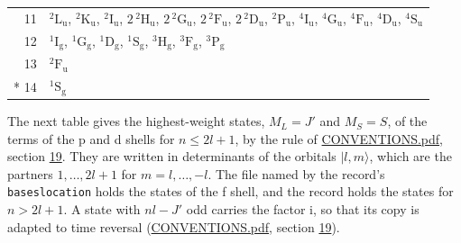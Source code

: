 \documentclass[10pt,a4paper]{article}
\numberwithin{equation}{section}
\newcommand{\spec}[1]{\mathrm{#1}}
\newcommand{\ptag}[1]{\mathrm{#1}}
\newcommand{\iunit}{\mathrm{i}}
\newcommand{\ket}[1]{\lvert #1\rangle}
\newcommand{\term}[2]{{}^{#1}#2}
\newlength{\fillwidth}\newlength{\cellwidth}\newlength{\colwidth}
\begin{document}
{\begin{longtable}{@{}r>{\RaggedRight\arraybackslash}p{\fillwidth}@{}}
11 & $\term{2}{\spec{L}_{\ptag{u}}}$, $\term{2}{\spec{K}_{\ptag{u}}}$, $\term{2}{\spec{I}_{\ptag{u}}}$, $2\,\term{2}{\spec{H}_{\ptag{u}}}$, $2\,\term{2}{\spec{G}_{\ptag{u}}}$, $2\,\term{2}{\spec{F}_{\ptag{u}}}$, $2\,\term{2}{\spec{D}_{\ptag{u}}}$, $\term{2}{\spec{P}_{\ptag{u}}}$, $\term{4}{\spec{I}_{\ptag{u}}}$, $\term{4}{\spec{G}_{\ptag{u}}}$, $\term{4}{\spec{F}_{\ptag{u}}}$, $\term{4}{\spec{D}_{\ptag{u}}}$, $\term{4}{\spec{S}_{\ptag{u}}}$\\
12 & $\term{1}{\spec{I}_{\ptag{g}}}$, $\term{1}{\spec{G}_{\ptag{g}}}$, $\term{1}{\spec{D}_{\ptag{g}}}$, $\term{1}{\spec{S}_{\ptag{g}}}$, $\term{3}{\spec{H}_{\ptag{g}}}$, $\term{3}{\spec{F}_{\ptag{g}}}$, $\term{3}{\spec{P}_{\ptag{g}}}$\\
13 & $\term{2}{\spec{F}_{\ptag{u}}}$\\*
14 & $\term{1}{\spec{S}_{\ptag{g}}}$\\
\bottomrule\end{longtable}}
\leavevmode\label{n:local.orbital.projection}\label{n:local.spin.projection}The next table gives the highest-weight states, $M_L = J'$ and $M_S = S$, of the terms of the p and d shells for $n \le 2l + 1$, by the rule of \href{../../CONVENTIONS.pdf}{CONVENTIONS.pdf}, section \href{../../CONVENTIONS.pdf\#conv.19}{19}. They are written in determinants of the orbitals $\ket{l, m}$, which are the partners $1, \dots, 2l + 1$ for $m = l, \dots, -l$. The file named by the record's \texttt{baseslocation} holds the states of the f shell, and the record holds the states for $n > 2l + 1$. A state with $nl - J'$ odd carries the factor $\iunit$, so that its copy is adapted to time reversal (\href{../../CONVENTIONS.pdf}{CONVENTIONS.pdf}, section \href{../../CONVENTIONS.pdf\#conv.19}{19}).
\end{document}
